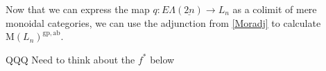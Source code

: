 \documentclass{amsbook} %
\newcommand{\ELnn}{E\Lambda(\underline{2n})}
\numberwithin{section}{chapter}
\begin{document}
%
Now that we can  express the map $q: \ELnn \to L_n$ as a colimit of mere monoidal categories, we can use the adjunction from \cref{Moradj} to calculate $\mathrm{M}(L_n)^{\mathrm{gp},\mathrm{ab}}$. %

QQQ Need to think about the $f^*$ below
\end{document}
